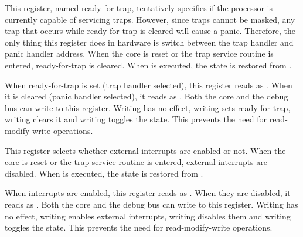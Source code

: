\implementation{}

This register, named ready-for-trap, tentatively specifies if the processor is
currently capable of servicing traps. However, since traps cannot be masked,
any trap that occurs while ready-for-trap is cleared will cause a panic.
Therefore, the only thing this register does in hardware is switch between the
trap handler and panic handler address. When the core is reset or the trap
service routine is entered, ready-for-trap is cleared. When  is 
executed, the state is restored from .

When ready-for-trap is set (trap handler selected), this register reads as 
. When it is cleared (panic handler selected), it reads as . 
Both the core and the debug bus can write to this register. Writing  
has no effect, writing  sets ready-for-trap, writing  clears 
it and writing  toggles the state. This prevents the need for 
read-modify-write operations.

\implementation{}

This register selects whether external interrupts are enabled or not. When the 
core is reset or the trap service routine is entered, external interrupts are 
disabled. When  is executed, the state is restored from .

When interrupts are enabled, this register reads as . When they are 
disabled, it reads as . Both the core and the debug bus can write to 
this register. Writing  has no effect, writing  enables 
external interrupts, writing  disables them and writing  
toggles the state. This prevents the need for read-modify-write operations.

\implementation{}


